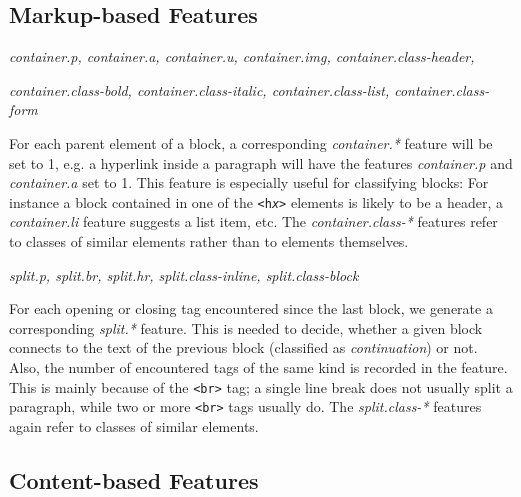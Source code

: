 \documentclass[12pt,a4paper, fleqn, leqno, twoside]{article}
\newcommand{\mysubsection}[1]{\subsection*{\bf #1}}
\begin{document}

\mysubsection{Markup-based Features}

\begin{description}

\item{\it container.p, container.a, container.u,
container.img, container.class-header,}\\[-4.5ex]
\item{\it
container.class-bold, container.class-italic,
container.class-list, container.class-form}

For each parent element of a block, a corresponding {\it container.*}
feature will be set to 1, e.g. a hyperlink inside a paragraph will
have the features \textit{container.p} and \textit{container.a} set to 1. This feature is
especially useful for classifying blocks: For instance a block contained
in one of the {\tt <h{\emph x}>} elements is likely to be a header, a
{\it container.li} feature suggests a list item, etc. %
The {\it container.class-*} features refer to classes of similar elements rather than to
elements themselves.

\item{\it split.p, split.br, split.hr,
split.class-inline, split.class-block}

For each opening or closing tag encountered since the last block, we
generate a corresponding {\it split.*} feature. This is needed to
decide, whether a given block connects to the text of the previous block
(classified as {\it continuation}) or not. Also, the number of encountered tags
of the same kind is recorded in the feature. This is mainly because of the
{\tt <br>} tag; a single line break does not usually split a paragraph, while
two or more {\tt <br>} tags
usually do. The {\it split.class-*} features again refer to classes of similar elements.


\end{description}

\mysubsection{Content-based Features}
\end{document}
